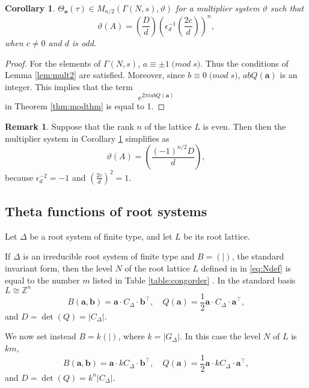 \documentclass[11pt,a4paper]{amsart}
\newtheorem{corollary}[theorem]{Corollary}
\theoremstyle{definition}
\newtheorem{remark}[theorem]{Remark}
\newcommand{\SZ}{\mathbb{Z}}                    %
\begin{document}
\begin{corollary}
		\label{cor:mult3} 
$\Theta_{\mathbf{a}}(\tau) \in M_{n/2}(\Gamma(N,s), \vartheta)$
for a multiplier system $\vartheta$ such that
\[ \vartheta(A)= \left(\frac{D}{d}\right)\left(\epsilon^{-1}_d \left(\frac{2c}{d}\right)\right)^n, \]
when $c \neq 0$ and $d$ is odd.
\end{corollary}
\begin{proof}
For the elements of $\Gamma(N,s)$, $a \equiv \pm 1 \; \mathrm(mod\; s)$. Thus the conditions of Lemma \ref{lem:mult2} are satisfied. Moreover, since $b \equiv 0 \; \mathrm(mod\; s)$, $ab Q(\mathbf{a})$ is an integer. This implies that the term 
\[ e^{2 \pi i ab Q(\mathbf{a})} \]
in Theorem \ref{thm:modthm} is equal to 1.
\end{proof}

\begin{remark} Suppose that the rank $n$ of the lattice $L$ is even. Then then the multiplier system in Corollary \ref{cor:mult3} simplifies as
	\[ \vartheta(A)= \left( \frac{(-1)^{n/2} D}{d} \right), \]
because	$\epsilon_d^{-2}=-1$ and $\left( \frac{2c}{d}\right)^2=1$.
\end{remark}

\subsection{Theta functions of root systems}

Let $\Delta$  be a root system of finite type, and let $L$ be its root lattice. 

If $\Delta$ is an irreducible root system of finite type and $B=(|)$, the standard invariant form, then the level $N$ of the root lattice $L$ defined in in \eqref{eq:Ndef} is equal to the number $m$ listed in Table \ref{table:congorder} \cite[page 261]{kac1994infinite}. In the standard basis  $L\cong \SZ^n$
\[ B(\mathbf{a},\mathbf{b})=\mathbf{a}\cdot C_{\Delta} \cdot \mathbf{b}^{\top}, \quad Q(\mathbf{a})=\frac{1}{2}\mathbf{a}\cdot C_{\Delta} \cdot \mathbf{a}^{\top}, \]
and $D=\det(Q)=|C_{\Delta}|$.


We now set instead $B=k(|)$, where $k=|G_{\Delta}|$. In this case the level $N$ of $L$ is $km$,
\[ B(\mathbf{a},\mathbf{b})=\mathbf{a}\cdot kC_{\Delta} \cdot \mathbf{b}^{\top}, \quad Q(\mathbf{a})=\frac{1}{2}\mathbf{a}\cdot kC_{\Delta} \cdot \mathbf{a}^{\top}, \]
and $D=\det(Q)=k^n|C_{\Delta}|$.





\end{document}
